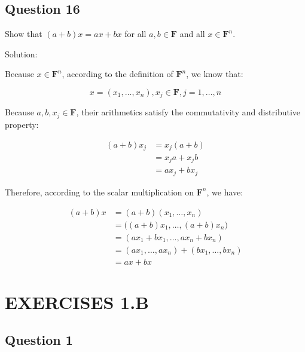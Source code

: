 \documentclass[12pt, letterpaper, oneside]{book}
\begin{document}
\subsection{Question 16}

Show that $(a + b)x = ax + bx$ for all $a, b \in \mathbf{F}$ and all $x \in
\mathbf{F}^n$.

Solution:

Because $x \in \mathbf{F}^n$, according to the definition of $\mathbf{F}^n$, we
know that:

\[ x = (x_1, \ldots, x_n), x_j \in \mathbf{F}, j = 1, \ldots, n \]

Because $a, b, x_j \in \mathbf{F}$, their arithmetics satisfy the commutativity
and distributive property:

\begin{equation*}
  \begin{split}
    (a + b)x_j
    & = x_j (a + b) \\
    & = x_j a + x_j b \\
    & = a x_j + b x_j
  \end{split}
\end{equation*}

Therefore, according to the scalar multiplication on $\mathbf{F}^n$, we have:

\begin{equation*}
  \begin{split}
    (a + b)x
    & = (a + b)(x_1, \ldots, x_n) \\
    & = \bigl((a + b)x_1, \ldots, (a + b)x_n\bigr) \\
    & = (a x_1 + b x_1, \ldots, a x_n + b x_n) \\
    & = (a x_1, \ldots, a x_n) + (b x_1, \ldots, b x_n) \\
    & = ax + bx
  \end{split}
\end{equation*}

\section{EXERCISES 1.B}

\subsection{Question 1}
\end{document}
